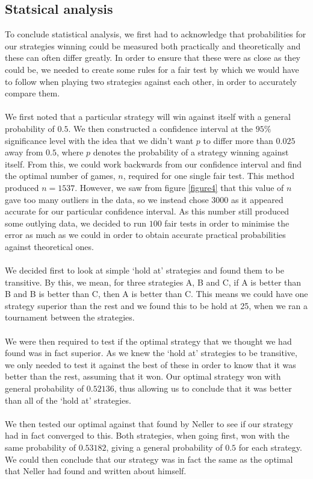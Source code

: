\documentclass[a4paper,titlepage]{article}
\begin{document}
\subsection{Statsical analysis}
To conclude statistical analysis, we first had to acknowledge that probabilities for our strategies winning could be measured both practically and theoretically and these can often differ greatly. In order to ensure that these were as close as they could be, we needed to create some rules for a fair test by which we would have to follow when playing two strategies against each other, in order to accurately compare them.\\ \\
We first noted that a particular strategy will win against itself with a general probability of $0.5$. We then constructed a confidence interval at the $95\%$ significance level with the idea that we didn’t want $p$ to differ more than $0.025$ away from $0.5$, where $p$ denotes the probability of a strategy winning against itself. From this, we could work backwards from our confidence interval and find the optimal number of games, $n$, required for one single fair test. This method produced $n=1537$. However, we saw from figure \ref{figure4} that this value of $n$ gave too many outliers in the data, so we instead chose $3000$ as it appeared accurate for our particular confidence interval. As this number still produced some outlying data, we decided to run $100$ fair tests in order to minimise the error as much as we could in order to obtain accurate practical probabilities against theoretical ones. \\ \\
We decided first to look at simple ‘hold at’ strategies and found them to be transitive. By this, we mean, for three strategies A, B and C, if A is better than B and B is better than C, then A is better than C. This means we could have one strategy superior than the rest and we found this to be hold at 25, when we ran a tournament between the strategies.\\ \\
We were then required to test if the optimal strategy that we thought we had found was in fact superior. As we knew the ‘hold at’ strategies to be transitive, we only needed to test it against the best of these in order to know that it was better than the rest, assuming that it won. Our optimal strategy won with general probability of $0.52136$, thus allowing us to conclude that it was better than all of the ‘hold at’ strategies.\\ \\
We then tested our optimal against that found by Neller\citep{neller2004optimal} to see if our strategy had in fact converged to this. Both strategies, when going first, won with the same probability of $0.53182$, giving a general probability of $0.5$ for each strategy. We could then conclude that our strategy was in fact the same as the optimal that Neller had found and written about himself. 
 
\nocite{*}


\end{document}
